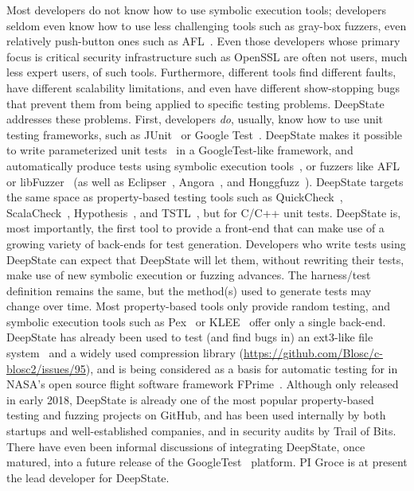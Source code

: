 Most developers do not know how to use symbolic execution tools; developers seldom even know how to use less challenging tools such as gray-box fuzzers, even relatively push-button ones such as AFL~\cite{aflfuzz}.  Even those developers whose primary focus is critical security infrastructure such as OpenSSL are often not users, much less expert users, of such tools.  Furthermore, different tools find different faults, have different scalability limitations, and even have different show-stopping bugs that prevent them from being applied to specific testing problems.  DeepState~\cite{DeepState,DeepStateTutorial} addresses these problems.  First, developers \emph{do}, usually, know how to use unit testing frameworks, such as JUnit~\cite{JUnit} or Google Test~\cite{GoogleTest}. DeepState makes it possible to write parameterized unit tests~\cite{ParamUnit} in a GoogleTest-like framework, and automatically produce tests using symbolic execution tools~\cite{angr1,angr2,angr3,Manticore}, or fuzzers like AFL~\cite{aflfuzz} or libFuzzer~\cite{libFuzzer} (as well as Eclipser~\cite{eclipser}, Angora~\cite{angora}, and Honggfuzz~\cite{Honggfuzz}).  DeepState targets the same space as property-based testing tools such as QuickCheck~\cite{ClaessenH00}, ScalaCheck~\cite{ScalaCheckDoc}, Hypothesis~\cite{Hypothesis}, and TSTL~\cite{NFM15,tstlsttt}, but for C/C++ unit tests. DeepState is, most importantly, the first tool to provide a front-end that can make use of a growing variety of back-ends for test generation.  Developers who write tests using DeepState can expect that DeepState will let them, without rewriting their tests, make use of new symbolic execution or fuzzing advances.  The harness/test definition remains the same, but the method(s) used to generate tests may change over time.  Most property-based tools only provide random testing, and symbolic execution tools such as Pex~\cite{Pex,UnitMeister} or KLEE~\cite{KLEE} offer only a single back-end.
DeepState has already been used to test (and find bugs in) an ext3-like file system~\cite{testfs,testfsrepo} and a widely used compression library (\url{https://github.com/Blosc/c-blosc2/issues/95}), and is being considered as a basis for automatic testing for in NASA's open source flight software framework FPrime~\cite{fprime,fprimerepo}.  Although only released in early 2018, DeepState is already one of the most popular property-based testing and fuzzing projects on GitHub, and has been used internally by both startups and well-established companies, and in security audits by Trail of Bits.  There have even been informal discussions of integrating DeepState, once matured, into a future release of the GoogleTest~\cite{GoogleTest} platform.  PI Groce is at present the lead developer for DeepState.